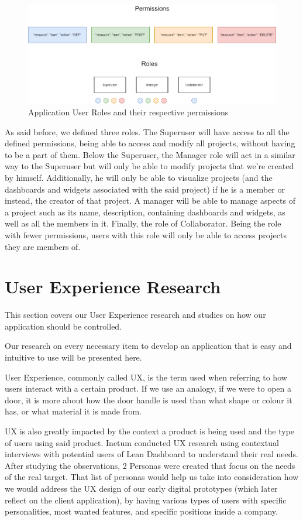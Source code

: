 \documentclass[a4paper,twoside,10pt]{report}
\begin{document}
\begin{figure}[h!]
\center
  \includegraphics[width=\textwidth]{lean-rbac-model.png}
\caption{Application User Roles and their respective permissions}
\end{figure}
As said before, we defined three roles. The Superuser will have access to all the defined permissions, being able to access and modify all projects, without having to be a part of them. 
Below the Superuser, the Manager role will act in a similar way to the Superuser but will only be able to modify projects that we're created by himself. Additionally, he will only be able to visualize projects (and the dashboards and widgets associated with the said project) if he is a member or instead, the creator of that project. A manager will be able to manage aspects of a project such as its name, description, containing dashboards and widgets, as well as all the members in it.
Finally, the role of Collaborator. Being the role with fewer permissions, users with this role will only be able to access projects they are members of.

\chapter{User Experience Research}
This section covers our User Experience research and studies on how our application should be controlled.

Our research on every necessary item to develop an application that is easy and intuitive to use will be presented here.

User Experience, commonly called UX, is the term used when referring to how users interact with a certain product. If we use an analogy, if we were to open a door, it is more about how the door handle is used than what shape or colour it has, or what material it is made from. 

UX is also greatly impacted by the context a product is being used and the type of users using said product. Inetum conducted UX research using contextual interviews with potential users of Lean Dashboard to understand their real needs. After studying the observations, 2 Personas were created that focus on the needs of the real target. That list of personas would help us take into consideration how we would address the UX design of our early digital prototypes (which later reflect on the client application), by having various types of users with specific personalities, most wanted features, and specific positions inside a company. 
\end{document}

